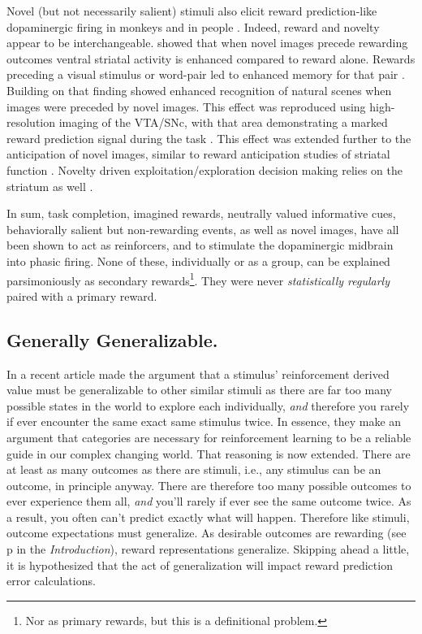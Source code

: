 Novel (but not necessarily salient) stimuli also elicit reward prediction-like dopaminergic firing in monkeys \citep{Blatter:2006p6372} and in people \citep{Bunzeck:2006p5319}. Indeed, reward and novelty appear to be interchangeable.  \citet{GuitartMasip:2010p7227} showed that when novel images precede rewarding outcomes ventral striatal activity is enhanced compared to reward alone.  Rewards preceding a visual stimulus or word-pair led to enhanced memory for that pair \citep{Lisman:2005p5455}.  Building on that finding \citet{Wittmann:2007p3328} showed enhanced recognition of natural scenes when images were preceded by novel images.  This effect was reproduced using high-resolution imaging of the VTA/SNc, with that area demonstrating a marked reward prediction signal during the task \citep{Krebs:2011p8134}.  This effect was extended further to the anticipation of novel images, similar to reward anticipation studies of striatal function \citep{Knutson:2001p5234}.  Novelty driven exploitation/exploration decision making relies on the striatum as well \citep{Wittmann:2008p541}.

In sum, task completion, imagined rewards, neutrally valued informative cues, behaviorally salient but non-rewarding events, as well as novel images, have all been shown to act as reinforcers, and to stimulate the dopaminergic midbrain into phasic firing.  None of these, individually or as a group, can be explained parsimoniously as secondary rewards\footnote{
    Nor as primary rewards, but this is a definitional problem.
}.  They were never \emph{statistically regularly} paired with a primary reward.

\subsection{Generally Generalizable.}
\label{sub:gen}
In a recent article \citet{Wimmer:2012p8836} made the argument that a stimulus' reinforcement derived value must be generalizable to other similar stimuli as there are far too many possible states in the world to explore each individually, \emph{and} therefore you rarely if ever encounter the same exact same stimulus twice.  In essence, they make an argument that categories are necessary for reinforcement learning to be a reliable guide in our complex changing world.  That reasoning is now extended.  There are at least as many outcomes as there are stimuli, i.e., any stimulus can be an outcome, in principle anyway. There are therefore too many possible outcomes to ever experience them all, \emph{and} you'll rarely if ever see the same outcome twice.  As a result, you often can't predict exactly what will happen. Therefore like stimuli, outcome expectations must generalize.  As desirable outcomes are rewarding (see p\pageref{sub:cogrew} in the \emph{Introduction}), reward representations generalize.  Skipping ahead a little, it is  hypothesized that the act of generalization will impact reward prediction error calculations.


